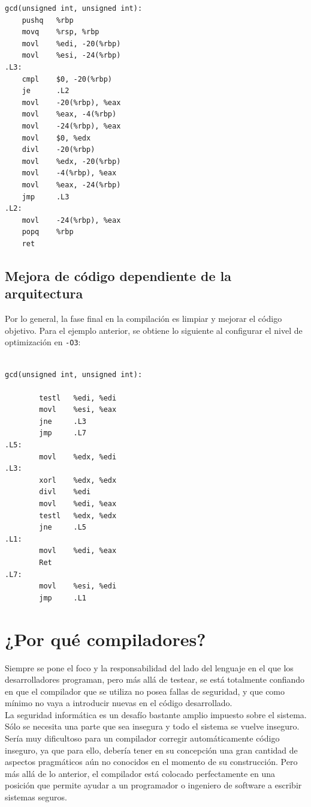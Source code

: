 \begin{lstlisting}[language={[x86masm]Assembler}, label={lst:assembler simple}, caption={Ejemplo assembler sin mejora}, captionpos={b}, frame={shadowbox}]
gcd(unsigned int, unsigned int):
    pushq   %rbp
    movq    %rsp, %rbp
    movl    %edi, -20(%rbp)
    movl    %esi, -24(%rbp)
.L3:
    cmpl    $0, -20(%rbp)
    je      .L2
    movl    -20(%rbp), %eax
    movl    %eax, -4(%rbp)
    movl    -24(%rbp), %eax
    movl    $0, %edx
    divl    -20(%rbp)
    movl    %edx, -20(%rbp)
    movl    -4(%rbp), %eax
    movl    %eax, -24(%rbp)
    jmp     .L3
.L2:
    movl    -24(%rbp), %eax
    popq    %rbp
    ret
\end{lstlisting}


\subsection{Mejora de código dependiente de la arquitectura}

Por lo general, la fase final en la compilación es limpiar y mejorar el código objetivo. Para el ejemplo anterior, se obtiene lo siguiente al configurar el nivel de optimización en \texttt{-O3}:
\begin{lstlisting}[language={[x86masm]Assembler}, label={lst:assembler improved}, caption={Ejemplo assembler con mejora}, captionpos={b}, frame={shadowbox}]

gcd(unsigned int, unsigned int):

        testl   %edi, %edi
        movl    %esi, %eax
        jne     .L3
        jmp     .L7
.L5:
        movl    %edx, %edi
.L3:
        xorl    %edx, %edx
        divl    %edi
        movl    %edi, %eax
        testl   %edx, %edx
        jne     .L5
.L1:
        movl    %edi, %eax
        Ret
.L7:
        movl    %esi, %edi
        jmp     .L1
\end{lstlisting}


\section{¿Por qué compiladores?}
\label{sect:marco:porque}
Siempre se pone el foco y la responsabilidad del lado del lenguaje en el que los desarrolladores programan, pero más allá de testear, se está totalmente confiando en que el compilador que se utiliza no posea fallas de seguridad, y que como mínimo no vaya a introducir nuevas en el código desarrollado.\\

La seguridad informática es un desafío bastante amplio impuesto sobre el sistema. Sólo se necesita una parte que sea insegura y todo el sistema se vuelve inseguro. Sería muy dificultoso para un compilador corregir automáticamente código inseguro, ya que para ello, debería tener en su concepción una gran cantidad de aspectos pragmáticos aún no conocidos en el momento de su construcción. Pero más allá de lo anterior, el compilador está colocado perfectamente en una posición que permite ayudar a un programador o ingeniero de software a escribir sistemas seguros.\\

